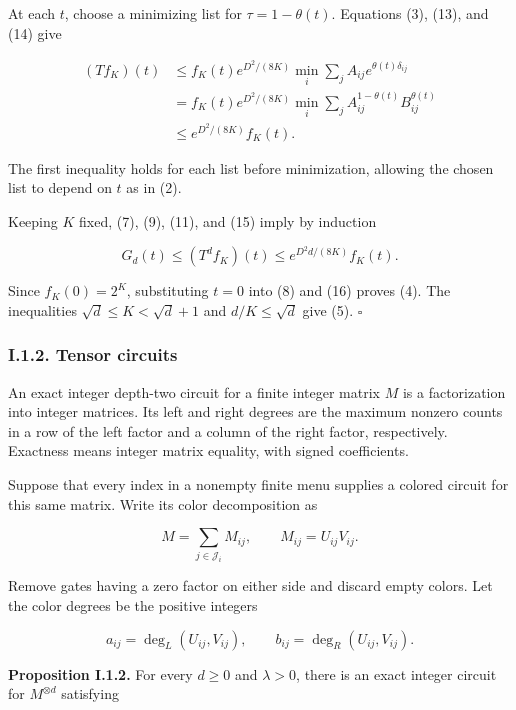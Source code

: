 At each \(t\), choose a minimizing list for \(\tau=1-\theta(t)\). Equations (3), (13), and (14) give

\[
\begin{aligned}
(Tf_K)(t)
&\leq f_K(t)e^{D^2/(8K)}
       \min_i\sum_j A_{ij}e^{\theta(t)\delta_{ij}}\\
&= f_K(t)e^{D^2/(8K)}
       \min_i\sum_j A_{ij}^{1-\theta(t)}B_{ij}^{\theta(t)}\\
&\leq e^{D^2/(8K)}f_K(t).
\end{aligned}
\tag{15}
\]

The first inequality holds for each list before minimization, allowing the chosen list to depend on \(t\) as in (2).

Keeping \(K\) fixed, (7), (9), (11), and (15) imply by induction

\[
G_d(t)\leq (T^df_K)(t)
\leq e^{D^2d/(8K)}f_K(t).
\tag{16}
\]

Since \(f_K(0)=2^K\), substituting \(t=0\) into (8) and (16) proves (4). The inequalities \(\sqrt d\leq K<\sqrt d+1\) and \(d/K\leq\sqrt d\) give (5). \(\square\)

\hypertarget{af-a9ec399514-i.1.2.-tensor-circuits}{%
\subsubsection{I.1.2. Tensor circuits}\label{af-a9ec399514-i.1.2.-tensor-circuits}}

An exact integer depth-two circuit for a finite integer matrix \(M\) is a factorization into integer matrices. Its left and right degrees are the maximum nonzero counts in a row of the left factor and a column of the right factor, respectively. Exactness means integer matrix equality, with signed coefficients.

Suppose that every index in a nonempty finite menu supplies a colored circuit for this same matrix. Write its color decomposition as

\[
M=\sum_{j\in\mathcal J_i}M_{ij},
\qquad M_{ij}=U_{ij}V_{ij}.
\tag{17}
\]

Remove gates having a zero factor on either side and discard empty colors. Let the color degrees be the positive integers

\[
a_{ij}=\deg_L(U_{ij},V_{ij}),\qquad
b_{ij}=\deg_R(U_{ij},V_{ij}).
\tag{18}
\]

\textbf{Proposition I.1.2.} For every \(d\geq0\) and \(\lambda>0\), there is an exact integer circuit for \(M^{\otimes d}\) satisfying

